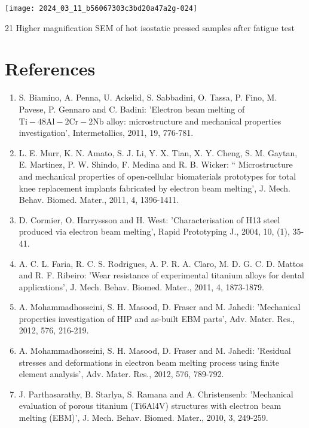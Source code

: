 \documentclass[10pt]{article}
\begin{document}
\begin{center}
\texttt{[image: 2024\_03\_11\_b56067303c3bd20a47a2g-024]}
\end{center}

21 Higher magnification SEM of hot isostatic pressed samples after fatigue test

\section*{References}
\begin{enumerate}
  \item S. Biamino, A. Penna, U. Ackelid, S. Sabbadini, O. Tassa, P. Fino, M. Pavese, P. Gennaro and C. Badini: 'Electron beam melting of $\mathrm{Ti}-48 \mathrm{Al}-2 \mathrm{Cr}-2 \mathrm{Nb}$ alloy: microstructure and mechanical properties investigation', Intermetallics, 2011, 19, 776-781.

  \item L. E. Murr, K. N. Amato, S. J. Li, Y. X. Tian, X. Y. Cheng, S. M. Gaytan, E. Martinez, P. W. Shindo, F. Medina and R. B. Wicker: “ Microstructure and mechanical properties of open-cellular biomaterials prototypes for total knee replacement implants fabricated by electron beam melting', J. Mech. Behav. Biomed. Mater., 2011, 4, 1396-1411.

  \item D. Cormier, O. Harryssson and H. West: 'Characterisation of H13 steel produced via electron beam melting', Rapid Prototyping J., 2004, 10, (1), 35-41.

  \item A. C. L. Faria, R. C. S. Rodrigues, A. P. R. A. Claro, M. D. G. C. D. Mattos and R. F. Ribeiro: 'Wear resistance of experimental titanium alloys for dental applications', J. Mech. Behav. Biomed. Mater., 2011, 4, 1873-1879.

  \item A. Mohammadhosseini, S. H. Masood, D. Fraser and M. Jahedi: 'Mechanical properties investigation of HIP and as-built EBM parts', Adv. Mater. Res., 2012, 576, 216-219.

  \item A. Mohammadhosseini, S. H. Masood, D. Fraser and M. Jahedi: 'Residual stresses and deformations in electron beam melting process using finite element analysis', Adv. Mater. Res., 2012, 576, 789-792.

  \item J. Parthasarathy, B. Starlya, S. Ramana and A. Christensenb: 'Mechanical evaluation of porous titanium (Ti6Al4V) structures with electron beam melting (EBM)', J. Mech. Behav. Biomed. Mater., 2010, 3, 249-259.


\end{enumerate}
\end{document}
